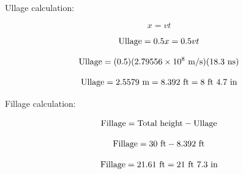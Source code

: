 Ullage calculation:

$$x = vt$$

$$\hbox{Ullage} = 0.5 x = 0.5 vt$$

$$\hbox{Ullage} = (0.5) (2.79556 \times 10^8 \hbox{ m/s}) (18.3 \hbox{ ns})$$

$$\hbox{Ullage} = 2.5579 \hbox{ m} = 8.392 \hbox{ ft} = 8 \hbox{ ft } 4.7 \hbox{ in}$$

\vskip 10pt

Fillage calculation:

$$\hbox{Fillage} = \hbox{Total height} - \hbox{Ullage}$$

$$\hbox{Fillage} = 30 \hbox{ ft} - 8.392 \hbox{ ft}$$

$$\hbox{Fillage} = 21.61 \hbox{ ft} = 21 \hbox{ ft } 7.3 \hbox{ in}$$




